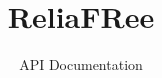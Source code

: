 \documentclass{article}
\begin{document}



\title{ReliaFRee}
\author{API Documentation}
\maketitle


\addtolength{\parskip}{-2ex}
\tableofcontents
\addtolength{\parskip}{2ex}

\end{document}
